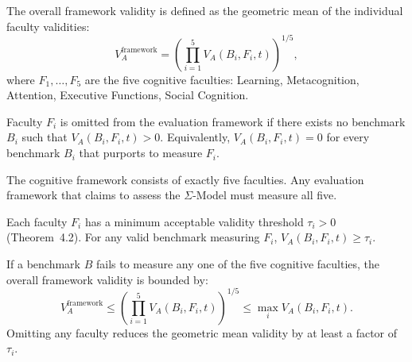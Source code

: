 
\begin{definition}
The overall framework validity is defined as the geometric mean of the
individual faculty validities:
\[
V_A^{\text{framework}} = \left(\prod_{i=1}^{5} V_A(B_i, F_i, t)\right)^{1/5},
\]
where $F_1, \dots, F_5$ are the five cognitive faculties:
Learning, Metacognition, Attention, Executive Functions,
Social Cognition.
\end{definition}

\begin{definition}[Omission]
Faculty $F_i$ is omitted from the evaluation framework if there exists
no benchmark $B_i$ such that $V_A(B_i, F_i, t) > 0$. Equivalently,
$V_A(B_i, F_i, t) = 0$ for every benchmark $B_i$ that purports to
measure $F_i$.
\end{definition}

\begin{assumption}
The cognitive framework consists of exactly five faculties. Any
evaluation framework that claims to assess the $\Sigma$-Model must
measure all five.
\end{assumption}

\begin{assumption}
Each faculty $F_i$ has a minimum acceptable validity threshold
$\tau_i > 0$ (Theorem~4.2). For any valid benchmark measuring $F_i$,
$V_A(B_i, F_i, t) \geq \tau_i$.
\end{assumption}

\begin{lemma}
\label{lem:omission}
If a benchmark $B$ fails to measure any one of the five cognitive
faculties, the overall framework validity is bounded by:
\[
V_A^{\text{framework}} \leq \left(\prod_{i=1}^{5} V_A(B_i, F_i, t)\right)^{1/5}
\leq \max_i V_A(B_i, F_i, t).
\]
Omitting any faculty reduces the geometric mean validity by at least
a factor of $\tau_i$.
\end{lemma}

